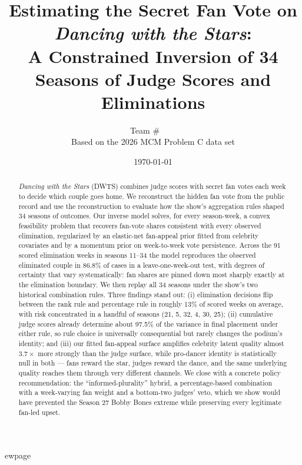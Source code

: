 \documentclass[11pt]{article}
\title{Estimating the Secret Fan Vote on \textit{Dancing with the Stars}:\\
A Constrained Inversion of 34 Seasons of Judge Scores and Eliminations}
\author{Team \#~~~~ \\
\small Based on the 2026 MCM Problem C data set}
\date{\today}
\begin{document}
\maketitle

\begin{abstract}

\noindent
\textit{Dancing with the Stars} (DWTS) combines judge scores with secret fan votes each week to
decide which couple goes home. We reconstruct the hidden fan vote from the public record and use
the reconstruction to evaluate how the show's aggregation rules shaped 34 seasons of outcomes.
Our inverse model solves, for every season-week, a convex feasibility problem that recovers
fan-vote shares consistent with every observed elimination, regularized by an elastic-net
fan-appeal prior fitted from celebrity covariates and by a momentum prior on week-to-week vote
persistence. Across the 91 scored elimination weeks in seasons 11--34 the model reproduces the
observed eliminated couple in 86.8\% of cases in a leave-one-week-out test, with degrees of
certainty that vary systematically: fan shares are pinned down most sharply exactly at the
elimination boundary. We then replay all 34 seasons under the show's two historical combination
rules. Three findings stand out: (i) elimination decisions flip between the rank rule and
percentage rule in roughly 13\% of scored weeks on average, with risk concentrated in a handful
of seasons (21, 5, 32, 4, 30, 25); (ii) cumulative judge scores already determine about 97.5\% of
the variance in final placement under either rule, so rule choice is universally consequential
but rarely changes the podium's identity; and (iii) our fitted fan-appeal surface amplifies
celebrity latent quality almost $3.7\times$ more strongly than the judge surface, while pro-dancer
identity is statistically null in both --- fans reward the star, judges reward the dance, and the
same underlying quality reaches them through very different channels. We close with a concrete
policy recommendation: the ``informed-plurality'' hybrid, a percentage-based combination with a
week-varying fan weight and a bottom-two judges' veto, which we show would have prevented the
Season 27 Bobby Bones extreme while preserving every legitimate fan-led upset.
\end{abstract}

\tableofcontents

ewpage

\end{document}
